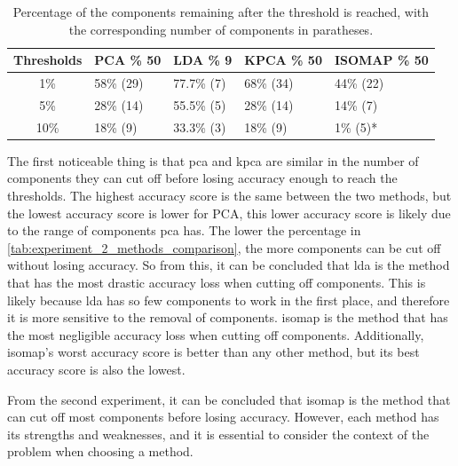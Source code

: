 \begin{table}[htb!]
    \centering
    \begin{tabular}{cp{}p{}p{}p{}}
        \toprule
        \textbf{Thresholds} & \textbf{PCA \% 50} & \textbf{LDA \% 9} & \textbf{KPCA \% 50} & \textbf{ISOMAP \% 50} \\ \midrule
        1\%                 & 58\% (29)          & 77.7\% (7)        & 68\% (34)           & 44\% (22)             \\
        5\%                 & 28\% (14)          & 55.5\% (5)        & 28\% (14)           & 14\% (7)              \\
        10\%                & 18\% (9)           & 33.3\% (3)        & 18\% (9)            & 1\% (5)*              \\
        \bottomrule
    \end{tabular}
    \caption{Percentage of the components remaining after the threshold is reached, with the corresponding number of components in paratheses.}
    \label{tab:experiment_2_methods_comparison}
\end{table}

The first noticeable thing is that \gls{pca} and \gls{kpca} are similar in the number of components they can cut off before losing accuracy enough to reach the thresholds. The highest accuracy score is the same between the two methods, but the lowest accuracy score is lower for PCA, this lower accuracy score is likely due to the range of components \gls{pca} has. The lower the percentage in \autoref{tab:experiment_2_methods_comparison}, the more components can be cut off without losing accuracy. So from this, it can be concluded that \gls{lda} is the method that has the most drastic accuracy loss when cutting off components. This is likely because \gls{lda} has so few components to work in the first place, and therefore it is more sensitive to the removal of components. \gls{isomap} is the method that has the most negligible accuracy loss when cutting off components. Additionally, \gls{isomap}'s worst accuracy score is better than any other method, but its best accuracy score is also the lowest.

From the second experiment, it can be concluded that \gls{isomap} is the method that can cut off most components before losing accuracy. However, each method has its strengths and weaknesses, and it is essential to consider the context of the problem when choosing a method.



